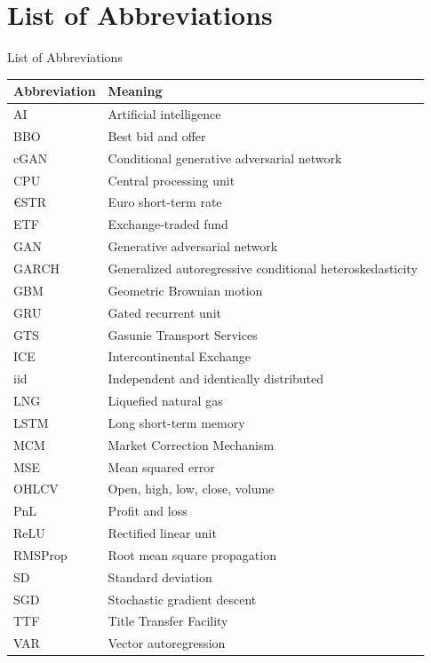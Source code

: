 \section*{List of Abbreviations}
%
  {List of Abbreviations}

\begin{longtable}{@{}ll@{}}
\toprule
Abbreviation & Meaning \\
\midrule
\endhead
AI & Artificial intelligence \\
BBO & Best bid and offer \\
cGAN & Conditional generative
  adversarial network \\
CPU & Central processing unit \\
€STR & Euro short-term rate \\
ETF & Exchange-traded fund \\
GAN & Generative adversarial
  network \\
GARCH & Generalized autoregressive
  conditional heteroskedasticity \\
GBM & Geometric Brownian motion \\
GRU & Gated recurrent unit \\
GTS & Gasunie Transport Services \\
ICE & Intercontinental Exchange \\
iid & Independent and identically
  distributed \\
LNG & Liquefied natural gas \\
LSTM & Long short-term memory \\
MCM & Market Correction Mechanism \\
MSE & Mean squared error \\
OHLCV & Open, high, low, close,
  volume \\
PnL & Profit and loss \\
ReLU & Rectified linear unit \\
RMSProp & Root mean square
  propagation \\
SD & Standard deviation \\
SGD & Stochastic gradient descent \\
TTF & Title Transfer Facility \\
VAR & Vector autoregression \\
\bottomrule
\end{longtable}
\addtocounter{table}{-1}